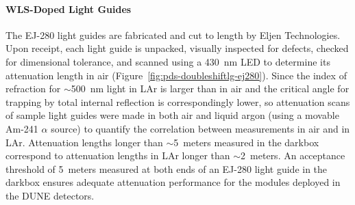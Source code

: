 \paragraph*{WLS-Doped Light Guides}

The EJ-280 light guides are fabricated and cut to length by Eljen Technologies. Upon receipt, each light guide is unpacked, visually inspected for defects, checked for dimensional tolerance, and scanned using a \SI{430}{nm} LED to determine its attenuation length in air (Figure~\ref{fig:pds-doubleshiftlg-ej280}). 
Since the index of refraction for $\sim$\SI{500}{nm} light in LAr is larger than in air and the critical angle for trapping by total internal reflection is correspondingly lower, so attenuation scans of sample light guides were made in both air and liquid argon (using a movable Am-241 $\alpha$ source) to quantify the correlation between measurements in air and in LAr.  Attenuation lengths longer than $\sim$5~meters measured in the darkbox correspond to attenuation lengths in LAr longer than $\sim$2~meters. An acceptance threshold of 5~meters measured at both ends of an EJ-280 light guide in the darkbox ensures adequate attenuation performance for the modules deployed in the DUNE detectors.


